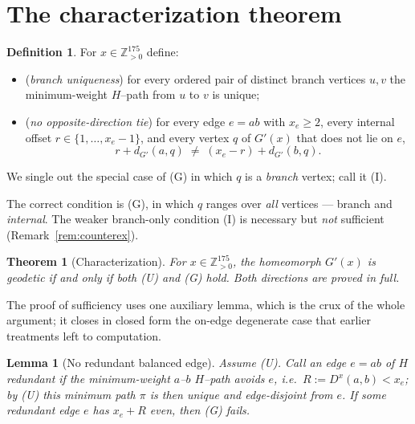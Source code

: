 \documentclass{amsart}
\newtheorem{theorem}{Theorem}
\newtheorem{lemma}{Lemma}
\theoremstyle{definition}
\newtheorem{definition}{Definition}
\begin{document}
\section{The characterization theorem}

\begin{definition}\label{def:conditions}
For $x\in\mathbb Z_{>0}^{175}$ define:
\begin{itemize}
\item[\textnormal{(U)}] (\emph{branch uniqueness}) for every ordered pair of
distinct branch vertices $u,v$ the minimum-weight $H$--path from $u$ to $v$ is
unique;
\item[\textnormal{(G)}] (\emph{no opposite-direction tie}) for every edge
$e=ab$ with $x_e\ge2$, every internal offset $r\in\{1,\dots,x_e-1\}$, and every
vertex $q$ of $G'(x)$ that does not lie on $e$,
\[
 r+d_{G'}(a,q)\;\neq\;(x_e-r)+d_{G'}(b,q).
\]
\end{itemize}
We single out the special case of \textnormal{(G)} in which $q$ is a
\emph{branch} vertex; call it \textnormal{(I)}.
\end{definition}

The correct condition is \textnormal{(G)}, in which $q$ ranges over \emph{all}
vertices --- branch and \emph{internal}. The weaker branch-only condition
\textnormal{(I)} is necessary but \emph{not} sufficient
(Remark~\ref{rem:counterex}).

\begin{theorem}[Characterization]\label{thm:main}
For $x\in\mathbb Z_{>0}^{175}$, the homeomorph $G'(x)$ is geodetic if and only if
both \textnormal{(U)} and \textnormal{(G)} hold. Both directions are proved in
full.
\end{theorem}

The proof of sufficiency uses one auxiliary lemma, which is the crux of the whole
argument; it closes in closed form the on-edge degenerate case that earlier
treatments left to computation.

\begin{lemma}[No redundant balanced edge]\label{lem:redundant}
Assume \textnormal{(U)}. Call an edge $e=ab$ of $H$ \emph{redundant} if the
minimum-weight $a$--$b$ $H$--path avoids $e$, i.e.\ $R:=D^x(a,b)<x_e$; by
\textnormal{(U)} this minimum path $\pi$ is then unique and edge-disjoint from
$e$. If some redundant edge $e$ has $x_e+R$ \emph{even}, then \textnormal{(G)}
fails.
\end{lemma}
\end{document}
